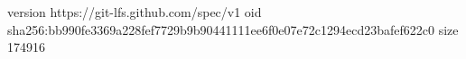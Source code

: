 version https://git-lfs.github.com/spec/v1
oid sha256:bb990fe3369a228fef7729b9b90441111ee6f0e07e72c1294ecd23bafef622c0
size 174916

